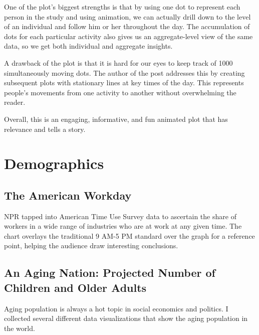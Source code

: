 \documentclass[]{book}
\theoremstyle{definition}
\theoremstyle{definition}
\theoremstyle{definition}
\theoremstyle{remark}
\begin{document}
One of the plot's biggest strengths is that by using one dot to
represent each person in the study and using animation, we can actually
drill down to the level of an individual and follow him or her
throughout the day. The accumulation of dots for each particular
activity also gives us an aggregate-level view of the same data, so we
get both individual and aggregate insights.

A drawback of the plot is that it is hard for our eyes to keep track of
1000 simultaneously moving dots. The author of the post addresses this
by creating subsequent plots with stationary lines at key times of the
day. This represents people's movements from one activity to another
without overwhelming the reader.

Overall, this is an engaging, informative, and fun animated plot that
has relevance and tells a story.

\section{Demographics}\label{demographics}

\subsection{The American Workday}\label{the-american-workday}

NPR tapped into American Time Use Survey data to ascertain the share of
workers in a wide range of industries who are at work at any given time.
The chart overlays the traditional 9 AM-5 PM standard over the graph for
a reference point, helping the audience draw interesting conclusions.

\subsection{An Aging Nation: Projected Number of Children and Older
Adults}\label{an-aging-nation-projected-number-of-children-and-older-adults}

\citep{aging_nation} Aging population is always a hot topic in social
economics and politics. I collected several different data
visualizations that show the aging population in the world.
\end{document}
